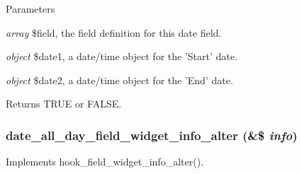 \begin{DoxyParams}{Parameters}
\item[{\em array}]\$field, the field definition for this date field. \item[{\em object}]\$date1, a date/time object for the 'Start' date. \item[{\em object}]\$date2, a date/time object for the 'End' date. \end{DoxyParams}
\begin{DoxyReturn}{Returns}
TRUE or FALSE. 
\end{DoxyReturn}
\hypertarget{date__all__day_8module_a405d14e66b39059a5b8bd5e0ac7674af}{
\subsubsection[{date\_\-all\_\-day\_\-field\_\-widget\_\-info\_\-alter}]{\setlength{\rightskip}{0pt plus 5cm}date\_\-all\_\-day\_\-field\_\-widget\_\-info\_\-alter (\&\$ {\em info})}}
\label{date__all__day_8module_a405d14e66b39059a5b8bd5e0ac7674af}
Implements hook\_\-field\_\-widget\_\-info\_\-alter().


